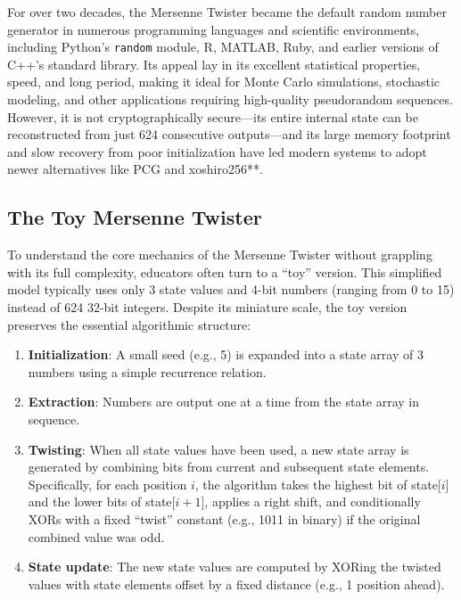 \documentclass[12pt]{article}
\begin{document}
For over two decades, the Mersenne Twister became the default random number generator in numerous programming languages and scientific environments, including Python's \texttt{random} module, R, MATLAB, Ruby, and earlier versions of C++'s standard library. Its appeal lay in its excellent statistical properties, speed, and long period, making it ideal for Monte Carlo simulations, stochastic modeling, and other applications requiring high-quality pseudorandom sequences. However, it is not cryptographically secure---its entire internal state can be reconstructed from just 624 consecutive outputs---and its large memory footprint and slow recovery from poor initialization have led modern systems to adopt newer alternatives like PCG and xoshiro256**.

\subsection*{The Toy Mersenne Twister}

To understand the core mechanics of the Mersenne Twister without grappling with its full complexity, educators often turn to a ``toy'' version. This simplified model typically uses only 3 state values and 4-bit numbers (ranging from 0 to 15) instead of 624 32-bit integers. Despite its miniature scale, the toy version preserves the essential algorithmic structure:

\begin{enumerate}
    \item \textbf{Initialization}: A small seed (e.g., 5) is expanded into a state array of 3 numbers using a simple recurrence relation.
    
    \item \textbf{Extraction}: Numbers are output one at a time from the state array in sequence.
    
    \item \textbf{Twisting}: When all state values have been used, a new state array is generated by combining bits from current and subsequent state elements. Specifically, for each position $i$, the algorithm takes the highest bit of state[$i$] and the lower bits of state[$i+1$], applies a right shift, and conditionally XORs with a fixed ``twist'' constant (e.g., 1011 in binary) if the original combined value was odd.
    
    \item \textbf{State update}: The new state values are computed by XORing the twisted values with state elements offset by a fixed distance (e.g., 1 position ahead).
\end{enumerate}
\end{document}
